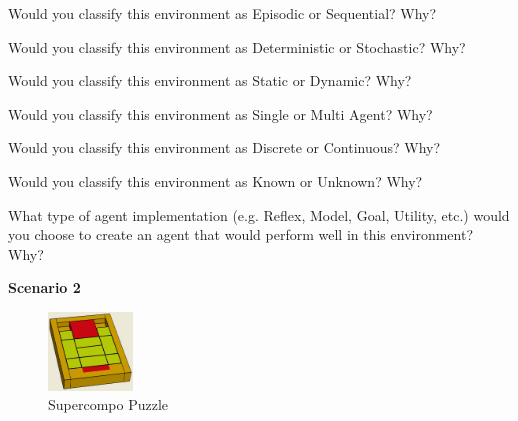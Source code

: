 \documentclass[11pt]{article}
\begin{document}
\begin{problem}{2}
  Would you classify this environment as Episodic or Sequential? Why?
  \vspace*{1in}
\end{problem}

\begin{problem}{2}
  Would you classify this environment as Deterministic or Stochastic? Why?
  \vspace*{1in}
\end{problem}

\begin{problem}{2}
  Would you classify this environment as Static or Dynamic? Why?
  \vspace*{1in}
\end{problem}

\begin{problem}{2}
  Would you classify this environment as Single or Multi Agent? Why?
  \vspace*{1in}
\end{problem}

\begin{problem}{2}
  Would you classify this environment as Discrete or Continuous? Why?
  \vspace*{1in}
\end{problem}

\begin{problem}{2}
  Would you classify this environment as Known or Unknown? Why?
  \vspace*{1in}
\end{problem}

\begin{problem}{2}
  What type of agent implementation (e.g. Reflex, Model, Goal, Utility, etc.) would you choose to create an agent that would perform well in this environment?  Why?
  \vspace*{1in}
\end{problem}


\newpage
\textbf{Scenario 2}

\begin{figure}
  \vspace{-22pt}
  \begin{center}
    \includegraphics[width=0.20\textwidth]{jk-supercompo.jpg}
  \end{center}
  \vspace{-20pt}
  \caption{Supercompo Puzzle}
\end{figure}
\end{document}
